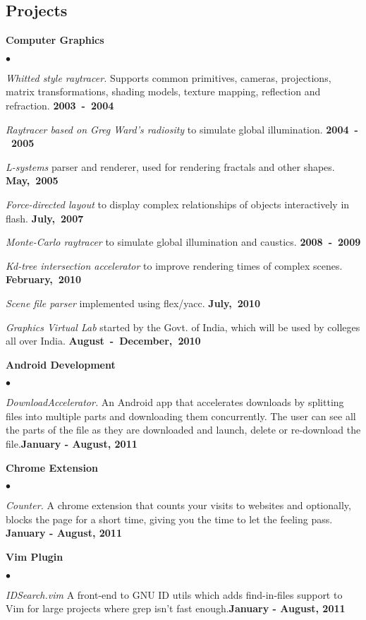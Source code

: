 \documentclass[margin,line]{res}
\newenvironment{list2}{
  \begin{list}{$\bullet$}{%
      \setlength{\itemsep}{0in}
      \setlength{\parsep}{0in} \setlength{\parskip}{0in}
      \setlength{\topsep}{0in} \setlength{\partopsep}{0in} 
      \setlength{\leftmargin}{0.2in}}}{\end{list}}
\begin{document}
\begin{resume}
\section{\sc Projects}
{\bf Computer Graphics}
\begin{list2}
\item {\em Whitted style raytracer.} Supports common primitives, cameras, projections,
matrix transformations, shading models, texture mapping, reflection and refraction. \hfill {\bf 2003~-~2004}
\item {\em Raytracer based on Greg Ward's radiosity} to simulate global illumination.  \hfill {\bf 2004~-~2005}
\item {\em L-systems} parser and renderer, used for rendering fractals and other shapes. \hfill {\bf May,~2005}
\item {\em Force-directed layout} to display complex relationships of objects interactively in flash. \hfill {\bf July,~2007}
\item {\em Monte-Carlo raytracer} to simulate global illumination and caustics. \hfill {\bf 2008~-~2009}
\item {\em Kd-tree intersection accelerator} to improve rendering times of complex scenes. \hfill {\bf February,~2010}
\item {\em Scene file parser} implemented using flex/yacc. \hfill {\bf July,~2010}
\item {\em Graphics Virtual Lab} started by the Govt. of India, which will be used by colleges all over India. \hfill {\bf August~-~December,~2010}
\end{list2}

{\bf Android Development}
\begin{list2}
\item {\em DownloadAccelerator.} An Android app that accelerates downloads by splitting files into multiple parts and downloading them concurrently. The user can see all the parts of the file as they are downloaded and launch, delete or re-download the file.\hfill {\bf January - August, 2011}
\end{list2}

{\bf Chrome Extension}
\begin{list2}
\item {\em Counter.} A chrome extension that counts your visits to websites and optionally, blocks the page for a short time, giving you the time to let the feeling pass. \hfill {\bf January - August, 2011}
\end{list2}

{\bf Vim Plugin}
\begin{list2}
\item {\em IDSearch.vim} A front-end to GNU ID utils which adds find-in-files support to Vim for large projects where grep isn't fast enough.\hfill {\bf January - August, 2011}
\end{list2}


\end{resume}
\end{document}
